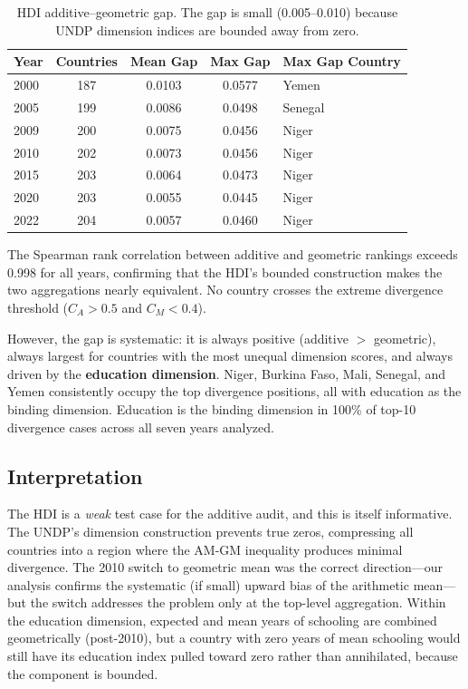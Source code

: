 \documentclass[12pt]{article}
\begin{document}
\begin{table}[h]
\centering
\begin{tabular}{@{}lcccl@{}}
\toprule
Year & Countries & Mean Gap & Max Gap & Max Gap Country \\
\midrule
2000 & 187 & 0.0103 & 0.0577 & Yemen \\
2005 & 199 & 0.0086 & 0.0498 & Senegal \\
2009 & 200 & 0.0075 & 0.0456 & Niger \\
2010 & 202 & 0.0073 & 0.0456 & Niger \\
2015 & 203 & 0.0064 & 0.0473 & Niger \\
2020 & 203 & 0.0055 & 0.0445 & Niger \\
2022 & 204 & 0.0057 & 0.0460 & Niger \\
\bottomrule
\end{tabular}
\caption{HDI additive--geometric gap. The gap is small (0.005--0.010) because UNDP dimension indices are bounded away from zero.}
\label{tab:hdi_summary}
\end{table}

The Spearman rank correlation between additive and geometric rankings exceeds 0.998 for all years, confirming that the HDI's bounded construction makes the two aggregations nearly equivalent. No country crosses the extreme divergence threshold ($C_A > 0.5$ and $C_M < 0.4$).

However, the gap is systematic: it is always positive (additive $>$ geometric), always largest for countries with the most unequal dimension scores, and always driven by the \textbf{education dimension}. Niger, Burkina Faso, Mali, Senegal, and Yemen consistently occupy the top divergence positions, all with education as the binding dimension. Education is the binding dimension in 100\% of top-10 divergence cases across all seven years analyzed.

\subsection{Interpretation}

The HDI is a \emph{weak} test case for the additive audit, and this is itself informative. The UNDP's dimension construction prevents true zeros, compressing all countries into a region where the AM-GM inequality produces minimal divergence. The 2010 switch to geometric mean was the correct direction---our analysis confirms the systematic (if small) upward bias of the arithmetic mean---but the switch addresses the problem only at the top-level aggregation. Within the education dimension, expected and mean years of schooling are combined geometrically (post-2010), but a country with zero years of mean schooling would still have its education index pulled toward zero rather than annihilated, because the component is bounded.
\end{document}
